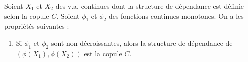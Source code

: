 \begin{propriete}{}{}
	Soient $X_1$ et $X_2$ des v.a. continues dont la structure de dépendance est définie selon la copule $C$. Soient $\phi_1$ et $\phi_2$ des fonctions continues monotones. On a les propriétés suivantes : 
	\begin{enumerate}
		\item Si $\phi_1$ et $\phi_2$ sont non décroissantes, alors la structure de dépendance de $(\phi(X_1), \phi(X_2))$ est la copule $C$.  
	\end{enumerate}
\end{propriete}





























































